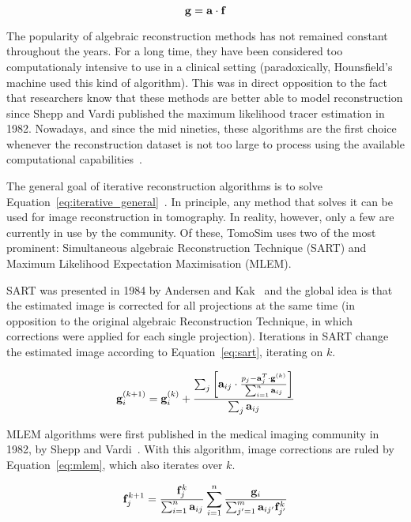 \begin{equation}
    \centering
    \mathbf{g} = \mathbf{a} \cdot \mathbf{f}
    \label{eq:iterative_general}
\end{equation}

The popularity of algebraic reconstruction methods has not remained
constant throughout the years. For a long time, they have been
considered too computationaly intensive to use in a clinical setting
(paradoxically, Hounsfield's machine used this kind of algorithm). This
was in direct opposition to the fact that researchers know that these
methods are better able to model reconstruction since Shepp and Vardi
published the maximum likelihood tracer estimation in 1982. Nowadays,
and since the mid nineties, these algorithms are the first choice
whenever the reconstruction dataset is not too large to process using
the available computational capabilities~\cite{Defrise2003}.

The general goal of iterative reconstruction algorithms is to solve
Equation~\ref{eq:iterative_general}~\cite{Bruyant2002a}. In principle,
any method that solves it can be used for image reconstruction in
tomography. In reality, however, only a few are currently in use by the
community. Of these, TomoSim uses two of the most prominent:
Simultaneous algebraic Reconstruction Technique (SART) and Maximum
Likelihood Expectation Maximisation (MLEM). 

SART was presented in 1984 by Andersen and Kak~\cite{Andersen1984a} and
the global idea is that the estimated image is corrected for all
projections at the same time (in opposition to the original algebraic
Reconstruction Technique, in which corrections were applied for each
single projection). Iterations in SART change the estimated image
according to Equation~\ref{eq:sart}, iterating on $k$.

\begin{equation}
    \centering
    \mathbf{g}_{i}^{(k+1)} = \mathbf{g}_{i}^{(k)} + \frac{\sum_j \left[
            \mathbf{a}_{ij} \cdot \frac{p_{j} - \mathbf{a}_{j}^{T} \cdot
    \mathbf{g}^{(k)}}{\sum_{i=1}^{n}\mathbf{a}_{ij}}\right]}{\sum_j
    \mathbf{a}_{ij}}
    \label{eq:sart}
\end{equation}

MLEM algorithms were first published in the medical imaging community in
1982, by Shepp and Vardi~\cite{Shepp1982}. With this algorithm, image
corrections are ruled by Equation~\ref{eq:mlem}, which also iterates
over $k$.

\begin{equation}
    \centering
    \mathbf{f}_{j}^{k + 1} =
    \frac{\mathbf{f}_{j}^{k}}{\sum_{i=1}^{n}\mathbf{a}_{ij}}
    \sum_{i=1}^{n}\frac{\mathbf{g}_i}{\sum_{j'=1}^{m}\mathbf{a}_{ij'}\mathbf{f}_{j'}^{k}}
    \label{eq:mlem}
\end{equation}

